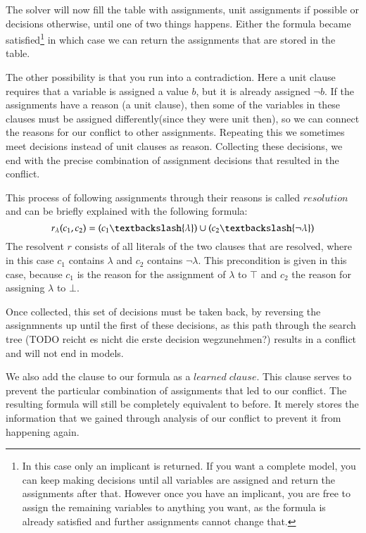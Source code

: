 The solver will now fill the table with assignments, unit assignments if possible or decisions otherwise, until one of two things happens. Either the formula became satisfied\footnote{
	In this case only an implicant is returned. If you want a complete model, you can keep making decisions until all variables are assigned and return the assignments after that. However once you have an implicant, you are free to assign the remaining variables to anything you want, as the formula is already satisfied and further assignments cannot change that.}
 in which case we can return the assignments that are stored in the table.

The other possibility is that you run into a contradiction. Here a unit clause requires that a variable is assigned a value $b$, but it is already assigned $\neg b$. If the assignments have a reason (a unit clause), then some of the variables in these clauses must be assigned differently(since they were unit then), so we can connect the reasons for our conflict to other assignments. Repeating this we sometimes meet decisions instead of unit clauses as reason. Collecting these decisions, we end with the precise combination of assignment decisions that resulted in the conflict. 


This process of following assignments through their reasons is called $resolution$ and can be briefly explained with the following formula:
$$
r_\lambda(c_1,c_2) = (c_1 \textbackslash \{\lambda\}) \cup (c_2 \textbackslash \{\neg \lambda\})
$$
The resolvent $r$ consists of all literals of the two clauses that are resolved, where in this case $c_1$ contains $\lambda$ and $c_2$ contains $\neg \lambda$. This precondition is given in this case, because $c_1$ is the reason for the assignment of $\lambda$ to $\top$ and $c_2$ the reason for assigning $\lambda$ to $\bot$.

Once collected, this set of decisions must be taken back, by reversing the assignmnents up until the first of these decisions, as this path through the search tree (TODO reicht es nicht die erste decision wegzunehmen?) results in a conflict and will not end in models. 

We also add the clause to our formula as a $learned\; clause$. This clause serves to prevent the particular combination of assignments that led to our conflict. The resulting formula will still be completely equivalent to before. It merely stores the information that we gained through analysis of our conflict to prevent it from happening again.

